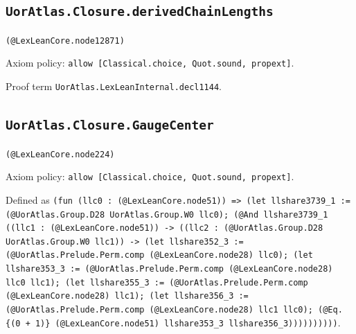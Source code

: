\documentclass[11pt]{article}
\begin{document}
\subsection*{\texttt{UorAtlas.Closure.derivedChainLengths}}
\noindent\texttt{(@LexLeanCore.node12871)}\par
\noindent Axiom policy: \texttt{allow [Classical.choice, Quot.sound, propext]}.\par
\noindent Proof term \texttt{UorAtlas.LexLeanInternal.decl1144}.\par
\subsection*{\texttt{UorAtlas.Closure.GaugeCenter}}
\noindent\texttt{(@LexLeanCore.node224)}\par
\noindent Axiom policy: \texttt{allow [Classical.choice, Quot.sound, propext]}.\par
\noindent Defined as \texttt{(fun (llc0 : (@LexLeanCore.node51)) => (let llshare3739\_1 := (@UorAtlas.Group.D28 UorAtlas.Group.W0 llc0); (@And llshare3739\_1 ((llc1 : (@LexLeanCore.node51)) -> ((llc2 : (@UorAtlas.Group.D28 UorAtlas.Group.W0 llc1)) -> (let llshare352\_3 := (@UorAtlas.Prelude.Perm.comp (@LexLeanCore.node28) llc0); (let llshare353\_3 := (@UorAtlas.Prelude.Perm.comp (@LexLeanCore.node28) llc0 llc1); (let llshare355\_3 := (@UorAtlas.Prelude.Perm.comp (@LexLeanCore.node28) llc1); (let llshare356\_3 := (@UorAtlas.Prelude.Perm.comp (@LexLeanCore.node28) llc1 llc0); (@Eq.\{(0 + 1)\} (@LexLeanCore.node51) llshare353\_3 llshare356\_3))))))))))}.\par
\end{document}
